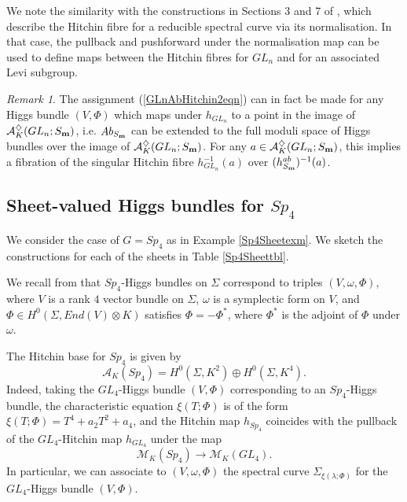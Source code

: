 \documentclass{amsart}
\theoremstyle{remark}
\newtheorem{remark}[theorem]{Remark}
\numberwithin{theorem}{section}
\numberwithin{equation}{section}
\begin{document}
We note the similarity with the constructions in Sections 3 and 7 of \cite{FraPN}, which describe the Hitchin fibre for a reducible spectral curve via its normalisation. In that case, the pullback and pushforward under the normalisation map can be used to define maps between the Hitchin fibres for $GL_n$ and for an associated Levi subgroup. 

\begin{remark}\label{GLnAbHitchinrmk}
    The assignment (\ref{GLnAbHitchin2eqn}) can in fact be made for any Higgs bundle $(V,\Phi)$ which maps under $h_{GL_n}$ to a point in the image of $\mathcal A^\diamondsuit_K(GL_n;S_{\bf m})$, i.e. $Ab_{S_{\bf m}}$ can be extended to the full moduli space of Higgs bundles over the image of $\mathcal A^\diamondsuit_K(GL_n;S_{\bf m})$. For any $a \in \mathcal A^\diamondsuit_K(GL_n;S_{\bf m})$, this implies a fibration of the singular Hitchin fibre $h_{GL_n}^{-1}(a)$ over $(h_{S_{\bf m}}^{ab})^{-1}(a)$.
\end{remark}

\subsection{Sheet-valued Higgs bundles for \texorpdfstring{$Sp_4$}{Sp4}}\label{Sp4Hitchinsbn}
We consider the case of $G= Sp_4$ as in Example \ref{Sp4Sheetexm}. We sketch the constructions for each of the sheets in Table \ref{Sp4Sheettbl}. 

We recall from \cite[Section 5.10]{Hitchin2} that $Sp_4$-Higgs bundles on $\Sigma$ correspond to triples $(V,\omega,\Phi)$, where $V$ is a rank $4$ vector bundle on $\Sigma$, $\omega$ is a symplectic form on $V$, and $\Phi \in H^0(\Sigma,End(V)\otimes K)$ satisfies $\Phi = -\Phi^* $, where $\Phi^*$ is the adjoint of $\Phi$ under $\omega$. 

The Hitchin base for $Sp_4$ is given by
\begin{equation}\label{Sp4Hitchinbaseeqn}
    \mathcal A_K(Sp_4) = H^0(\Sigma,K^2) \oplus H^0(\Sigma,K^4).
\end{equation}
Indeed, taking the $GL_4$-Higgs bundle $(V,\Phi)$ corresponding to an $Sp_4$-Higgs bundle, the characteristic equation $\xi(T;\Phi)$ is of the form $\xi(T;\Phi) = T^4+a_2T^2+a_4$, and the Hitchin map $h_{Sp_4}$ coincides with the pullback of the $GL_4$-Hitchin map $h_{GL_4}$ under the map
\begin{equation}\label{Sp4toGL4Higgseqn}
    \mathcal M_K(Sp_4) \rightarrow \mathcal M_K(GL_4).
\end{equation}
In particular, we can associate to $(V,\omega,\Phi)$ the spectral curve ${\Sigma}_{\xi(\lambda;\Phi)}$ for the $GL_4$-Higgs bundle $(V,\Phi)$. 
\end{document}
